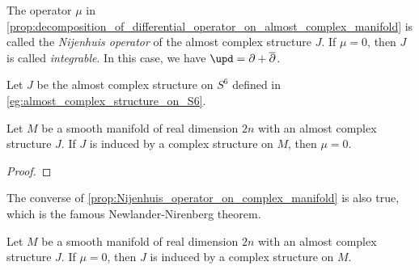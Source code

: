     \begin{definition}\label{def:Nijenhuis_operator}
        The operator \(\mu\) in \cref{prop:decomposition_of_differential_operator_on_almost_complex_manifold} is called the \emph{Nijenhuis operator} of the almost complex structure \(J\).
        If \(\mu = 0\), then \(J\) is called \emph{integrable}.
        In this case, we have \(\upd = \partial + \overline{\partial}\).
    \end{definition}

    \begin{example}\label{eg:Nijenhuis_operator_on_S6_for_the_almost_complex_structure_on_S6_by_octonion}
        Let \(J\) be the almost complex structure on \(S^6\) defined in \cref{eg:almost_complex_structure_on_S6}.
        
    \end{example}

    \begin{proposition}\label{prop:Nijenhuis_operator_on_complex_manifold}
        Let \(M\) be a smooth manifold of real dimension \(2n\) with an almost complex structure \(J\).
        If \(J\) is induced by a complex structure on \(M\), then \(\mu = 0\).
    \end{proposition}
    \begin{proof}
    \end{proof}



    The converse of \cref{prop:Nijenhuis_operator_on_complex_manifold} is also true, which is the famous Newlander-Nirenberg theorem.

    \begin{theorem}\label{thm:newlander_nirenberg_theorem}
        Let \(M\) be a smooth manifold of real dimension \(2n\) with an almost complex structure \(J\).
        If \(\mu = 0\), then \(J\) is induced by a complex structure on \(M\).
    \end{theorem}